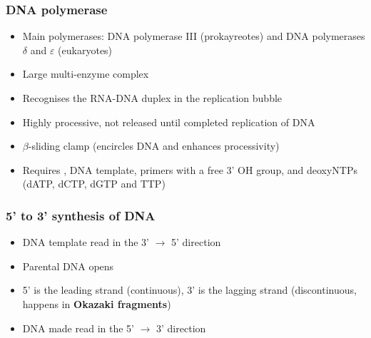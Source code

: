 \documentclass[letterpaper, 12pt]{article}
\begin{document}
\subsubsection*{DNA polymerase}
\begin{itemize}
\item Main polymerases: DNA polymerase III (prokayreotes) and DNA polymerases $\delta$ and $\varepsilon$ (eukaryotes)
\item Large multi-enzyme complex
\item Recognises the RNA-DNA duplex in the replication bubble
\item Highly processive, not released until completed replication of DNA
\item $\beta$-sliding clamp (encircles DNA and enhances processivity)
\item Requires , DNA template, primers with a free 3' OH group, and deoxyNTPs (dATP, dCTP, dGTP and TTP)
\end{itemize}

\subsubsection*{5' to 3' synthesis of DNA}
\begin{itemize}
\item DNA template read in the 3' $\to$ 5' direction
\item Parental DNA opens
\item 5' is the leading strand (continuous), 3' is the lagging strand (discontinuous, happens in \textbf{Okazaki fragments})
\item DNA made read in the 5' $\to$ 3' direction
\end{itemize}
\end{document}
